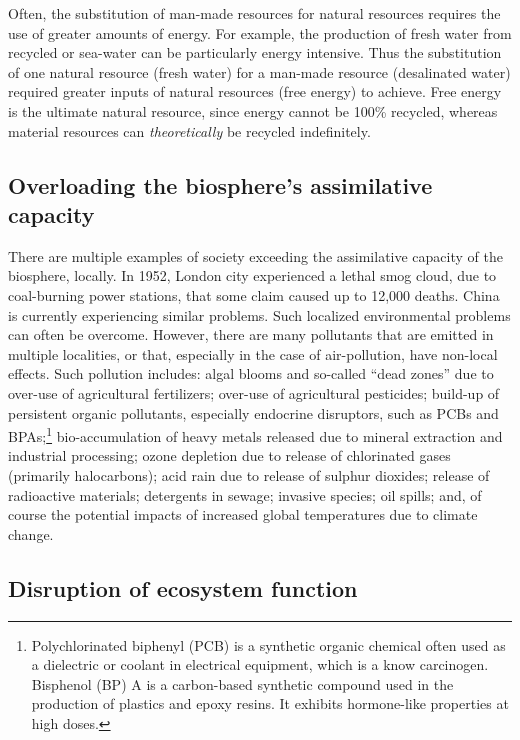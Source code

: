 Often, the substitution of man-made resources for natural resources
requires the use of greater amounts of energy.
For example, the production of fresh water from recycled or sea-water
can be particularly energy intensive.
Thus the substitution of one natural resource (fresh water)
for a man-made resource (desalinated water)
required greater inputs of natural resources (free energy) to achieve.
Free energy is the ultimate natural resource, since energy cannot be 100\% recycled,
whereas material resources can \emph{theoretically} be recycled indefinitely.


\subsection{Overloading the biosphere's assimilative capacity}

There are multiple examples of society exceeding 
the assimilative capacity of the biosphere, locally.
In 1952, London city experienced a lethal smog cloud,
due to coal-burning power stations,
that some claim caused up to 12,000 deaths.\cite{Davis2002,Bell2004}
China is currently experiencing similar problems.
Such localized environmental problems can often be overcome. 
However,
there are many pollutants that are emitted in multiple localities,
or that, especially in the case of air-pollution, have non-local effects.
Such pollution includes:
algal blooms and so-called ``dead zones'' due to over-use of agricultural fertilizers;
over-use of agricultural pesticides;
build-up of persistent organic pollutants, especially endocrine disruptors, such as PCBs 
and BPAs;\footnote{Polychlorinated biphenyl (PCB) is a synthetic organic chemical often used as 
								a dielectric or coolant in electrical equipment, which is a know carcinogen.
								Bisphenol (BP) A is a carbon-based synthetic compound used in the production
								of plastics and epoxy resins. It exhibits hormone-like properties at high doses.
								}
bio-accumulation of heavy metals released due to mineral extraction and industrial processing;
ozone depletion due to release of chlorinated gases (primarily halocarbons);
acid rain due to release of sulphur dioxides;
release of radioactive materials;
detergents in sewage;
invasive species;
oil spills;
and, of course the potential impacts of increased global temperatures 
due to climate change.~\cite{Butler1978, UNMEA2005, Walker2012}


\subsection{Disruption of ecosystem function}


